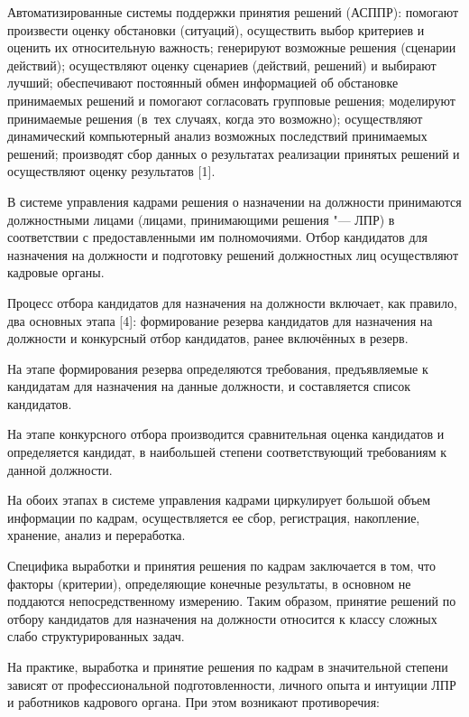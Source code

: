 Автоматизированные системы поддержки принятия решений (АСППР): помогают произвести оценку обстановки (ситуаций), осуществить выбор критериев и оценить их относительную важность; генерируют возможные решения (сценарии действий); осуществляют оценку сценариев (действий, решений) и выбирают лучший; обеспечивают постоянный обмен информацией об обстановке принимаемых решений и помогают согласовать групповые решения; моделируют принимаемые решения (в~тех случаях, когда это возможно); осуществляют динамический компьютерный анализ возможных последствий принимаемых решений; производят сбор данных о результатах реализации принятых решений и осуществляют оценку результатов [1].



В системе управления кадрами решения о назначении на должности принимаются должностными лицами (лицами, принимающими решения "--- ЛПР) в соответствии с предоставленными им полномочиями. Отбор кандидатов для назначения на должности и подготовку решений должностных лиц осуществляют кадровые органы.



Процесс отбора кандидатов для назначения на должности включает, как правило, два основных этапа [4]: формирование резерва кандидатов для назначения на должности и конкурсный отбор кандидатов, ранее включённых в резерв.



На этапе формирования резерва определяются требования, предъявляемые к кандидатам для назначения на данные должности, и составляется список кандидатов.



На этапе конкурсного отбора производится сравнительная оценка кандидатов и определяется кандидат, в наибольшей степени соответствующий требованиям к данной должности.



На обоих этапах в системе управления кадрами циркулирует большой объем информации по кадрам, осуществляется ее сбор, регистрация, накопление, хранение, анализ и переработка.



Специфика выработки и принятия решения по кадрам заключается в том, что факторы (критерии), определяющие конечные результаты, в основном не поддаются непосредственному измерению. Таким образом, принятие решений по отбору кандидатов для назначения на должности относится к классу сложных слабо структурированных задач. 



На практике, выработка и принятие решения по кадрам в значительной степени зависят от профессиональной подготовленности, личного опыта и интуиции ЛПР и работников кадрового органа. При этом возникают противоречия:




